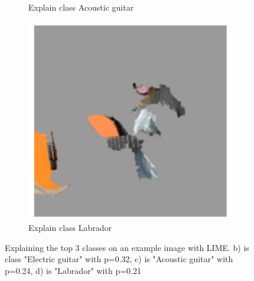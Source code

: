 \begin{figure}[H]
\begin{subfigure}[t]{.23\textwidth}
        \caption{Explain class Acoustic guitar}
    \end{subfigure}\hfill%
    \begin{subfigure}[t]{.23\textwidth}
        \centering
        \includegraphics[width=\linewidth]{chapters/02_methods/images/lime_dog_3.png}
        \caption{Explain class Labrador}
    \end{subfigure}
    \caption{Explaining the top 3 classes on an example image with LIME. b) is class "Electric guitar" with p=0.32, c) is "Acoustic guitar" with p=0.24, d) is "Labrador" with p=0.21}
    \label{lime_dog}
\end{figure}

